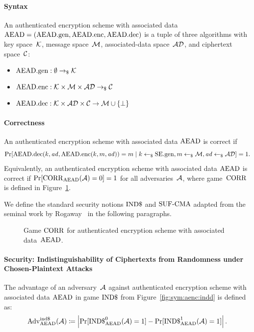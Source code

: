 \documentclass[a4paper,orivec]{llncs}
\begin{document}
\paragraph{Syntax}
An authenticated encryption scheme with associated data $\mathrm{AEAD}=(\mathrm{AEAD}.\mathrm{gen},\mathrm{AEAD}.\mathrm{enc},\mathrm{AEAD}.\mathrm{dec})$ is a tuple of three algorithms with key space~$\mathcal{K}$, message space~$\mathcal{M}$, associated-data space~$\mathcal{AD}$, and ciphertext space~$\mathcal{C}$:

\begin{itemize}
    \item $\mathrm{AEAD}.\mathrm{gen}: \emptyset \to_\$ \mathcal{K}$
    \item $\mathrm{AEAD}.\mathrm{enc}: \mathcal{K}\times\mathcal{M}\times\mathcal{AD} \to_\$ \mathcal{C}$
    \item $\mathrm{AEAD}.\mathrm{dec}: \mathcal{K}\times\mathcal{AD}\times\mathcal{C} \to \mathcal{M}\cup\{\bot\}$
\end{itemize}

\paragraph{Correctness}
An authenticated encryption scheme with associated data $\mathrm{AEAD}$ is correct if 
\[
\Pr[\mathrm{AEAD}.\mathrm{dec}(k,\mathit{ad},\mathrm{AEAD}.\mathrm{enc}(k,m,\mathit{ad}))=m\mid k\gets_\$\mathrm{SE}.\mathrm{gen},m\gets_\$\mathcal{M},\mathit{ad}\gets_\$\mathcal{AD}]=1\text{.}
\]
Equivalently, an authenticated encryption scheme with associated data $\mathrm{AEAD}$ is correct if $\Pr[\mathrm{CORR}_{\mathrm{AEAD}}(\mathcal{A})=0]=1$ for all adversaries~$\mathcal{A}$, where game~$\mathrm{CORR}$ is defined in Figure~\ref{fig:sym:aenc:corr}.

We define the standard security notions ${\mathrm{IND}\$}$ and ${\mathrm{SUF}\text{-}\mathrm{CMA}}$ adapted from the seminal work by Rogaway~\cite{CCS:Rogaway02} in the following paragraphs.

\begin{figure}[!ht]
    \centering
    \nicoresetlinenr%
    \fbox{%
        \scalebox{\codescalefactor}{%
        }%
    }
    \caption{%
        Game $\mathrm{CORR}$ for authenticated encryption scheme with associated data~$\mathrm{AEAD}$.
    }
    \label{fig:sym:aenc:corr}
\end{figure}

\paragraph{Security: Indistinguishability of Ciphertexts from Randomness under Chosen-Plaintext Attacks}
The advantage of an adversary~$\mathcal{A}$ against authenticated encryption scheme with associated data $\mathrm{AEAD}$ in game ${\mathrm{IND}\$}$ from Figure~\ref{fig:sym:aenc:indd} is defined as:
\[
\mathrm{Adv}_{\mathrm{AEAD}}^{\mathrm{ind}\$}(\mathcal{A})\coloneqq\left|\Pr[{\mathrm{IND}\$}_{\mathrm{AEAD}}^0(\mathcal{A})=1]-\Pr[{\mathrm{IND}\$}_{\mathrm{AEAD}}^1(\mathcal{A})=1]\right|\text{.}
\]
\end{document}
